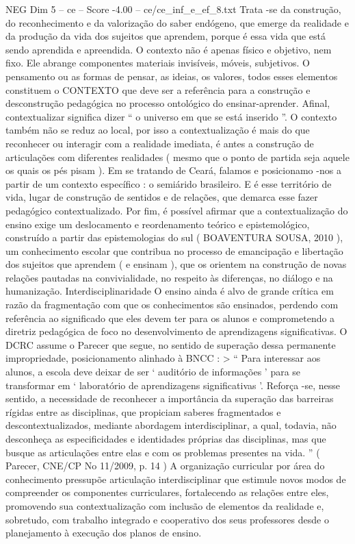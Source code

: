 \begin{textsample}{NEG Dim 5 – ce – Score -4.00 – ce/ce\_inf\_e\_ef\_8.txt}
Trata -se da construção, do reconhecimento e da valorização do saber endógeno, que emerge da realidade e da produção da vida dos sujeitos que aprendem, porque é essa vida que está sendo aprendida e apreendida.
O contexto não é apenas físico e objetivo, nem fixo.
Ele abrange componentes materiais invisíveis, móveis, subjetivos.
O pensamento ou as formas de pensar, as ideias, os valores, todos esses elementos constituem o CONTEXTO que deve ser a referência para a construção e desconstrução pedagógica no processo ontológico do ensinar-aprender.
Afinal, contextualizar significa dizer “ o universo em que se está inserido ”.
O contexto também não se reduz ao local, por isso a contextualização é mais do que reconhecer ou interagir com a realidade imediata, é antes a construção de articulações com diferentes realidades ( mesmo que o ponto de partida seja aquele os quais os pés pisam ).
Em se tratando de Ceará, falamos e posicionamo -nos a partir de um contexto específico : o semiárido brasileiro.
E é esse território de vida, lugar de construção de sentidos e de relações, que demarca esse fazer pedagógico contextualizado.
Por fim, é possível afirmar que a contextualização do ensino exige um deslocamento e reordenamento teórico e epistemológico, construído a partir das epistemologias do sul ( BOAVENTURA SOUSA, 2010 ), um conhecimento escolar que contribua no processo de emancipação e libertação dos sujeitos que aprendem ( e ensinam ), que os orientem na construção de novas relações pautadas na convivialidade, no respeito às diferenças, no diálogo e na humanização.
Interdisciplinaridade O ensino ainda é alvo de grande crítica em razão da fragmentação com que os conhecimentos são ensinados, perdendo com referência ao significado que eles devem ter para os alunos e comprometendo a diretriz pedagógica de foco no desenvolvimento de aprendizagens significativas.
O DCRC assume o Parecer que segue, no sentido de superação dessa permanente impropriedade, posicionamento alinhado à BNCC : > “ Para interessar aos alunos, a escola deve deixar de ser ‘ auditório de informações ’ para se transformar em ‘ laboratório de aprendizagens significativas ’.
Reforça -se, nesse sentido, a necessidade de reconhecer a importância da superação das barreiras rígidas entre as disciplinas, que propiciam saberes fragmentados e descontextualizados, mediante abordagem interdisciplinar, a qual, todavia, não desconheça as especificidades e identidades próprias das disciplinas, mas que busque as articulações entre elas e com os problemas presentes na vida. ” ( Parecer, CNE/CP No 11/2009, p. 14 ) A organização curricular por área do conhecimento pressupõe articulação interdisciplinar que estimule novos modos de compreender os componentes curriculares, fortalecendo as relações entre eles, promovendo sua contextualização com inclusão de elementos da realidade e, sobretudo, com trabalho integrado e cooperativo dos seus professores desde o planejamento à execução dos planos de ensino.

\end{textsample}
